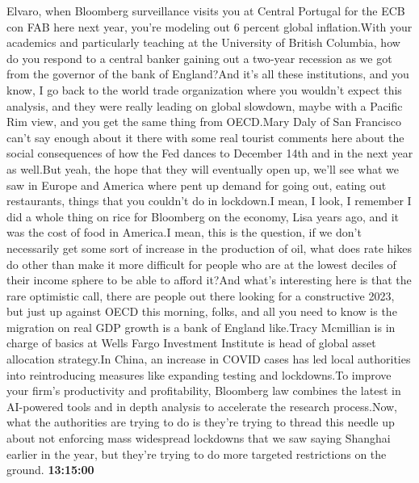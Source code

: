 \documentclass{article}%
\begin{document}
Elvaro, when Bloomberg surveillance visits you at Central Portugal for the ECB con FAB here next year, you're modeling out 6 percent global inflation.With your academics and particularly teaching at the University of British Columbia, how do you respond to a central banker gaining out a two{-}year recession as we got from the governor of the bank of England?And it's all these institutions, and you know, I go back to the world trade organization where you wouldn't expect this analysis, and they were really leading on global slowdown, maybe with a Pacific Rim view, and you get the same thing from OECD.Mary Daly of San Francisco can't say enough about it there with some real tourist comments here about the social consequences of how the Fed dances to December 14th and in the next year as well.But yeah, the hope that they will eventually open up, we'll see what we saw in Europe and America where pent up demand for going out, eating out restaurants, things that you couldn't do in lockdown.I mean, I look, I remember I did a whole thing on rice for Bloomberg on the economy, Lisa years ago, and it was the cost of food in America.I mean, this is the question, if we don't necessarily get some sort of increase in the production of oil, what does rate hikes do other than make it more difficult for people who are at the lowest deciles of their income sphere to be able to afford it?And what's interesting here is that the rare optimistic call, there are people out there looking for a constructive 2023, but just up against OECD this morning, folks, and all you need to know is the migration on real GDP growth is a bank of England like.Tracy Mcmillian is in charge of basics at Wells Fargo Investment Institute is head of global asset allocation strategy.In China, an increase in COVID cases has led local authorities into reintroducing measures like expanding testing and lockdowns.To improve your firm's productivity and profitability, Bloomberg law combines the latest in AI{-}powered tools and in depth analysis to accelerate the research process.Now, what the authorities are trying to do is they're trying to thread this needle up about not enforcing mass widespread lockdowns that we saw saying Shanghai earlier in the year, but they're trying to do more targeted restrictions on the ground.%
\textbf{13:15:00}%
\newline%
\end{document}
